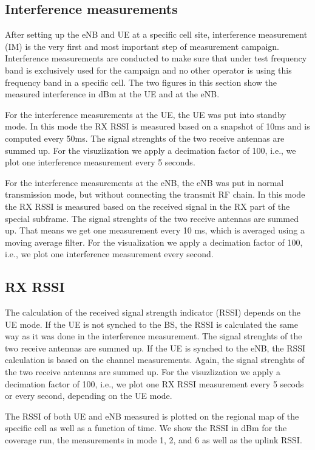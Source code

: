 \documentclass[a4paper,10pt]{article}
\begin{document}
\subsection{Interference measurements}

After setting up the eNB and UE at a specific cell site, interference measurement (IM) is the very first and most important step of measurement campaign. Interference measurements are conducted to make sure that under test frequency band is exclusively used for the campaign and no other operator is using this frequency band in a specific cell. The two figures in this section show the measured interference in dBm at the UE and at the eNB. 

For the interference measurements at the UE, the UE was put into standby mode. In this mode the RX RSSI is measured based on a snapshot of 10ms and is computed every 50ms. The signal strenghts of the two receive antennas are summed up. For the visuzlization we apply a decimation factor of 100, i.e., we plot one interference measurement every 5 seconds.

For the interference measurements at the eNB, the eNB was put in normal transmission mode, but without connecting the transmit RF chain. In this mode the RX RSSI is measured based on the received signal in the RX part of the special subframe. The signal strenghts of the two receive antennas are summed up. That means we get one measurement every 10 ms, which is averaged using a moving average filter. For the visualization we apply a decimation factor of 100, i.e., we plot one interference measurement every second. 

\subsection{RX RSSI}

The calculation of the received signal strength indicator (RSSI) depends on the UE mode. If the UE is not synched to the BS, the RSSI is calculated the same way as it was done in the interference measurement. The signal strenghts of the two receive antennas are summed up. If the UE is synched to the eNB, the RSSI calculation is based on the channel measurements. Again, the signal strenghts of the two receive antennas are summed up. For the visuzlization we apply a decimation factor of 100, i.e., we plot one RX RSSI measurement every 5 secods or every second, depending on the UE mode.

The RSSI of both UE and eNB measured is plotted on the regional map of the specific cell as well as a function of time. We show the RSSI in dBm for the coverage run, the measurements in mode 1, 2, and 6 as well as the uplink RSSI. 
\end{document}

